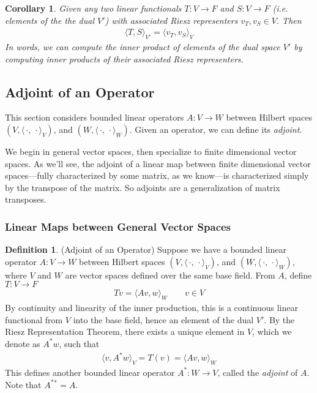 \documentclass[12pt]{book}
\numberwithin{equation}{section} %
\theoremstyle{plain}
\newtheorem{cor}[thm]{Corollary}
\theoremstyle{definition}
\newtheorem{defn}[thm]{Definition}
\theoremstyle{remark}
\newcommand{\ra}{\rightarrow}
\begin{document}
\begin{cor}
Given any two linear functionals $T:V\ra F$ and $S:V\ra F$
(i.e.  elements of the the dual $V'$) with associated Riesz representers
$v_T,v_S\in V$.
Then
\begin{align*}
  \langle T,S\rangle_{V'}
  =
  \langle v_T,v_S\rangle_V
\end{align*}
In words, we can compute the inner product of elements of the dual space
$V'$ by computing inner products of their associated Riesz representers.
\end{cor}



\clearpage
\subsection{Adjoint of an Operator}

This section considers bounded linear operators $A:V\ra W$ between
Hilbert spaces
$(V,\langle\,\cdot,\,\cdot\rangle_V)$,
and
$(W,\langle\,\cdot,\,\cdot\rangle_W)$.
Given an operator, we can define its \emph{adjoint}.

We begin in general vector spaces, then specialize to finite dimensional
vector spaces.
As we'll see, the adjoint of a linear map between finite dimensional
vector spaces---fully characterized by some matrix, as we know---is
characterized simply by the transpose of the matrix.
So adjoints are a generalization of matrix transposes.


\subsubsection{Linear Maps between General Vector Spaces}


\begin{defn}(Adjoint of an Operator)
\label{defn:adjoint}
Suppose we have a bounded linear operator $A:V\ra W$ between Hilbert
spaces
$(V,\langle\,\cdot,\,\cdot\rangle_V)$,
and
$(W,\langle\,\cdot,\,\cdot\rangle_W)$,
where $V$ and $W$ are vector spaces defined over the same base field.
From $A$, define $T:V\ra F$
\begin{align*}
  Tv = \langle Av,w\rangle_W
  \qquad
  v\in V
\end{align*}
By continuity and linearity of the inner production, this is a
continuous linear functional from $V$ into the base field, hence an
element of the dual $V'$.
By the Riesz Representation Theorem, there exists a unique element
in $V$, which we denote as $A^*w$, such that
\begin{align*}
  \langle v,A^*w \rangle_V
  =
  T(v)
  =
  \langle Av,w\rangle_W
\end{align*}
This defines another bounded linear operator
$A^*:W\ra V$, called the \emph{adjoint} of $A$.
Note that $A^*{}^*=A$.
\end{defn}
\end{document}
